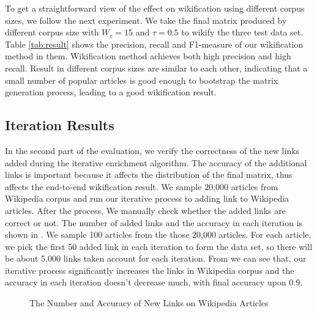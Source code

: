 To get a straightforward view of the effect on wikification using
different corpus sizes, we follow the next experiment. We take the
final matrix produced by different corpus size with $W_c = 15$ and
$\tau = 0.5$ to wikify
the three test data set. Table \ref{tab:result} shows the
precision, recall and F1-measure of our wikification method in them.
Wikification method achieves both high precision and high recall.
Result in different corpus sizes are similar to each other, indicating
that a small number of popular articles is good enough to %
bootstrap the matrix generation process, leading to a good wikification result.

\subsection{Iteration Results}
In the second part of the evaluation, we verify the correctness of the new links
added during the iterative enrichment algorithm.
The accuracy of the additional links is important because it affects the
distribution of the final matrix, thus affects the end-to-end wikification result.
We sample 20,000 articles from Wikipedia corpus and run our iterative process
to adding link to Wikipedia articles. After the process,
We manually check whether the added links are correct or not. The number of
added links and the accuracy in each iteration is shown in .
We sample 100 articles from the those 20,000 articles. For each article, we pick
the first 50 added link in each iteration to form the data set, so there will be
about 5,000 links taken account for each iteration. From  we
can see that, our iterative process significantly increases the links in Wikipedia
corpus and the accuracy in each iteration doesn't decrease much, with final accuracy
upon 0.9.

\begin{figure}[th]
\centering
{}
\caption{The Number and Accuracy of New Links on Wikipedia Articles}
\label{fig:2wlink}
\end{figure}

